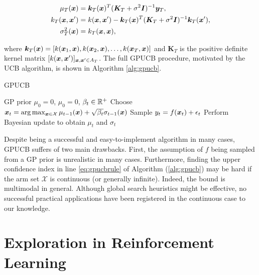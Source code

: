 \begin{align}
\mu_T(\boldsymbol{x}) &= \boldsymbol{k}_T(\boldsymbol{x})^T(\boldsymbol{K}_T+\sigma^2\boldsymbol{I})^{-1}\boldsymbol{y}_T, \\
k_T(\boldsymbol{x},\boldsymbol{x}') &= k(\boldsymbol{x},\boldsymbol{x}')-\boldsymbol{k}_T(\boldsymbol{x})^T(\boldsymbol{K}_T+\sigma^2\boldsymbol{I})^{-1}\boldsymbol{k}_T(\boldsymbol{x}'),\\
\sigma^2_T(\boldsymbol{x}) &= k_T(\boldsymbol{x},\boldsymbol{x}),\\
\end{align}

where $\boldsymbol{k}_T(\boldsymbol{x}) = [k(\boldsymbol{x}_1,\boldsymbol{x}),k(\boldsymbol{x}_2,\boldsymbol{x}),\dots,k(\boldsymbol{x}_T,\boldsymbol{x})]$ and $\boldsymbol{K}_T$ is the positive definite kernel matrix $[k(\boldsymbol{x},\boldsymbol{x}')]_{\boldsymbol{x},\boldsymbol{x}'\in A_T}$.
The full \gls{GPUCB} procedure, motivated by the \gls{UCB} algorithm, is shown in Algorithm \ref{alg:gpucb}.

\begin{algorithm}[t]
	\caption{\gls{GPUCB}}
	\label{alg:gpucb}
	\begin{algorithmic}[1]
	 GP prior $\mu_0=0$, $\mu_0=0$, $\beta_t\in\mathbb{R}^+$
		\State Choose $\boldsymbol{x}_t = \arg\max_{\boldsymbol{x}\in\mathcal{X}}\mu_{t-1}(\boldsymbol{x})+\sqrt{\beta_t}\sigma_{t-1}(\boldsymbol{x})$ \label{eq:gpucbrule}
		\State Sample $y_t = f(\boldsymbol{x}_t)+\epsilon_t$
		\State Perform Bayesian update to obtain $\mu_t$ and $\sigma_t$
	\EndFor
	\end{algorithmic}
\end{algorithm}

Despite being a successful and easy-to-implement algorithm in many cases, \gls{GPUCB} suffers of two main drawbacks. First, the assumption of $f$ being sampled from a \gls{GP} prior is unrealistic in many cases. Furthermore, finding the upper confidence index in line \ref{eq:gpucbrule} of Algorithm (\ref{alg:gpucb}) may be hard if the arm set $\mathcal{X}$ is continuous (or generally infinite). Indeed, the bound is multimodal in general. Although global search heuristics might be effective, no successful practical applications have been registered in the continuous case to our knowledge. 

\section{Exploration in Reinforcement Learning}

